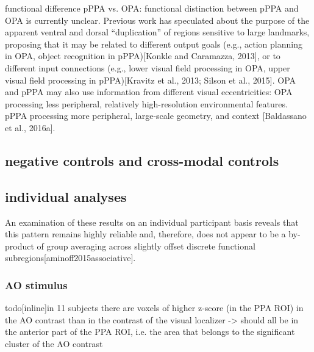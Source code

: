 \documentclass[english]{article}
\begin{document}
%
\citep{baldassano2016two} functional difference pPPA vs. OPA: functional
distinction between pPPA and OPA is currently unclear. Previous work has
speculated about the purpose of the apparent ventral and dorsal ``duplication''
of regions sensitive to large landmarks, proposing that it may be related to
different output goals (e.g., action planning in OPA, object recognition in
pPPA)[Konkle and Caramazza, 2013], or to different input connections (e.g.,
lower visual field processing in OPA, upper visual field processing in
pPPA)[Kravitz et al., 2013; Silson et al., 2015]. OPA and pPPA may also use
information from different visual eccentricities: OPA processing less
peripheral, relatively high-resolution environmental features. pPPA processing
more peripheral, large-scale geometry, and context [Baldassano et al.,
2016a]\citep{baldassano2016two}.


\subsection{negative controls and cross-modal controls}



\subsection{individual analyses}

An examination of these results on an individual participant basis reveals that
this pattern remains highly reliable and, therefore, does not appear to be a
by-product of group averaging across slightly offset discrete functional
subregions[aminoff2015associative].


\subsubsection{AO stimulus}



todo[inline]{in 11 subjects there are voxels of higher z-score (in the PPA ROI)
    in the AO contrast than in the contrast of the visual localizer -> should
    all be in the anterior part of the PPA ROI, i.e. the area that belongs to
    the significant cluster of the AO contrast}
\end{document}
